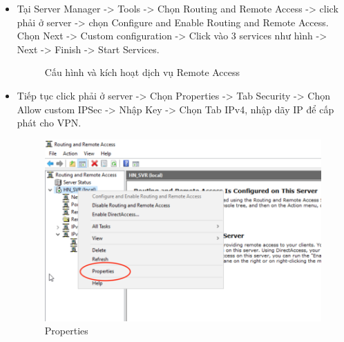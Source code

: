 \begin{itemize}
        \item Tại Server Manager -> Tools -> Chọn Routing and Remote Access -> click phải ở server -> chọn Configure and Enable Routing and Remote Access. Chọn Next -> Custom configuration -> Click vào 3 services như hình -> Next -> Finish -> Start Services.
        \begin{figure}[htbp]
            \hfill
            \hfill
            \caption{Cấu hình và kích hoạt dịch vụ Remote Access}
        \end{figure}
        \newpage
        \item Tiếp tục click phải ở server -> Chọn Properties -> Tab Security -> Chọn Allow custom IPSec -> Nhập Key -> Chọn Tab IPv4, nhập dãy IP để cấp phát cho VPN. 

            \begin{figure}[htbp]
            \centering
            \includegraphics[width=0.7\linewidth]{SiteToSiteImg/conf3.png}
            \caption{Properties}
            \end{figure}
        

\end{itemize}
